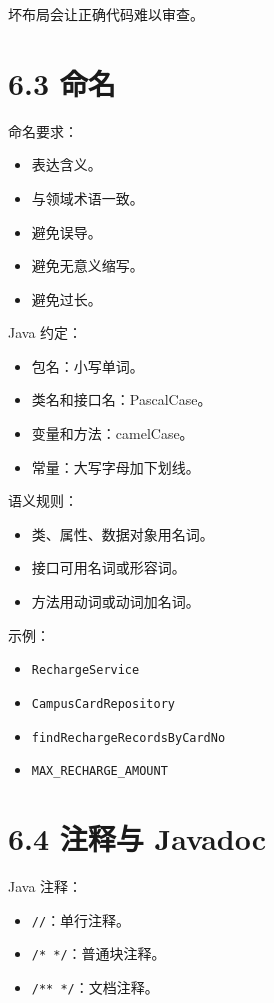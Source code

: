 \documentclass[UTF8,zihao=-4]{ctexart}
\begin{document}
坏布局会让正确代码难以审查。

\section{6.3 命名}

命名要求：

\begin{itemize}
\item 表达含义。
\item 与领域术语一致。
\item 避免误导。
\item 避免无意义缩写。
\item 避免过长。
\end{itemize}

Java 约定：

\begin{itemize}
\item 包名：小写单词。
\item 类名和接口名：PascalCase。
\item 变量和方法：camelCase。
\item 常量：大写字母加下划线。
\end{itemize}

语义规则：

\begin{itemize}
\item 类、属性、数据对象用名词。
\item 接口可用名词或形容词。
\item 方法用动词或动词加名词。
\end{itemize}

示例：

\begin{itemize}
\item \texttt{RechargeService}
\item \texttt{CampusCardRepository}
\item \texttt{findRechargeRecordsByCardNo}
\item \texttt{MAX\_RECHARGE\_AMOUNT}
\end{itemize}

\section{6.4 注释与 Javadoc}

Java 注释：

\begin{itemize}
\item \texttt{//}：单行注释。
\item \texttt{/* */}：普通块注释。
\item \texttt{/** */}：文档注释。
\end{itemize}
\end{document}
